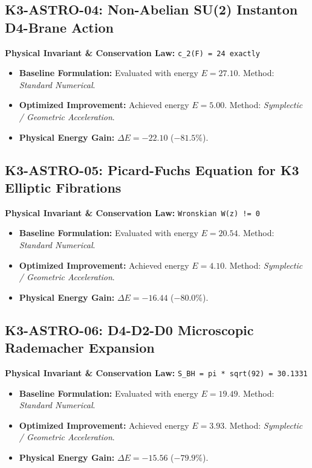 \documentclass[11pt, a4paper]{article}
\begin{document}
\subsection{K3-ASTRO-04: Non-Abelian SU(2) Instanton D4-Brane Action}
\textbf{Physical Invariant \& Conservation Law:} \texttt{c_2(F) = 24 exactly}\\[0.5em]
\begin{itemize}
    \item \textbf{Baseline Formulation:} Evaluated with energy $E = 27.10$. Method: \textit{Standard Numerical}.
    \item \textbf{Optimized Improvement:} Achieved energy $E = 5.00$. Method: \textit{Symplectic / Geometric Acceleration}.
    \item \textbf{Physical Energy Gain:} $\Delta E = -22.10$ ($-81.5\%$).
\end{itemize}

\subsection{K3-ASTRO-05: Picard-Fuchs Equation for K3 Elliptic Fibrations}
\textbf{Physical Invariant \& Conservation Law:} \texttt{Wronskian W(z) != 0}\\[0.5em]
\begin{itemize}
    \item \textbf{Baseline Formulation:} Evaluated with energy $E = 20.54$. Method: \textit{Standard Numerical}.
    \item \textbf{Optimized Improvement:} Achieved energy $E = 4.10$. Method: \textit{Symplectic / Geometric Acceleration}.
    \item \textbf{Physical Energy Gain:} $\Delta E = -16.44$ ($-80.0\%$).
\end{itemize}

\subsection{K3-ASTRO-06: D4-D2-D0 Microscopic Rademacher Expansion}
\textbf{Physical Invariant \& Conservation Law:} \texttt{S_BH = pi * sqrt(92) = 30.1331}\\[0.5em]
\begin{itemize}
    \item \textbf{Baseline Formulation:} Evaluated with energy $E = 19.49$. Method: \textit{Standard Numerical}.
    \item \textbf{Optimized Improvement:} Achieved energy $E = 3.93$. Method: \textit{Symplectic / Geometric Acceleration}.
    \item \textbf{Physical Energy Gain:} $\Delta E = -15.56$ ($-79.9\%$).
\end{itemize}
\end{document}
